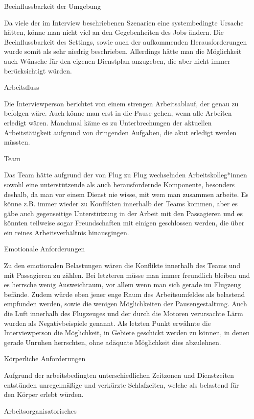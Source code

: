\documentclass[12pt, a4paper]{article}
\begin{document}
Beeinflussbarkeit der Umgebung

Da viele der im Interview beschriebenen Szenarien eine systembedingte Ursache hätten, könne man nicht viel an den Gegebenheiten des Jobs ändern.
Die Beeinflussbarkeit des Settings, sowie auch der aufkommenden Herausforderungen wurde somit als sehr niedrig beschrieben. 
Allerdings hätte man die Möglichkeit auch Wünsche für den eigenen Dienstplan anzugeben, die aber nicht immer berücksichtigt würden.

Arbeitsfluss

Die Interviewperson berichtet von einem strengen Arbeitsablauf, der genau zu befolgen wäre.
Auch könne man erst in die Pause gehen, wenn alle Arbeiten erledigt wären. 
Manchmal käme es zu Unterbrechungen der aktuellen Arbeitstätigkeit aufgrund von dringenden Aufgaben, die akut erledigt werden müssten.

Team

Das Team hätte aufgrund der von Flug zu Flug wechselnden Arbeitskolleg*innen sowohl eine unterstützende als auch herausfordernde Komponente, 
besonders deshalb, da man vor einem Dienst nie wisse, mit wem man zusammen arbeite.
Es könne z.B. immer wieder zu Konflikten innerhalb der Teams kommen, aber es gäbe auch gegenseitige 
Unterstützung in der Arbeit mit den Passagieren und es könnten teilweise sogar Freundschaften mit einigen geschlossen werden, die über ein reines Arbeitsverhältnis hinausgingen.

Emotionale Anforderungen

Zu den emotionalen Belastungen wären die Konflikte innerhalb des Teams und mit Passagieren zu zählen.
Bei letzteren müsse man immer freundlich bleiben und es herrsche wenig Ausweichraum, vor allem wenn man sich gerade im Flugzeug befände.
Zudem würde eben jener enge Raum des Arbeitsumfeldes als belastend empfunden werden, sowie die wenigen Möglichkeiten der Pausengestaltung. 
Auch die Luft innerhalb des Flugzeuges und der durch die Motoren verursachte Lärm wurden als Negativbeispiele genannt. 
Als letzten Punkt erwähnte die Interviewperson die Möglichkeit, in Gebiete geschickt werden zu können, 
in denen gerade Unruhen herrschten, ohne adäquate Möglichkeit dies abzulehnen.

Körperliche Anforderungen

Aufgrund der arbeitsbedingten unterschiedlichen Zeitzonen und Dienstzeiten entstünden unregelmäßige und verkürzte Schlafzeiten,
welche als belastend für den Körper erlebt würden.

Arbeitsorganisatorisches
\end{document}
